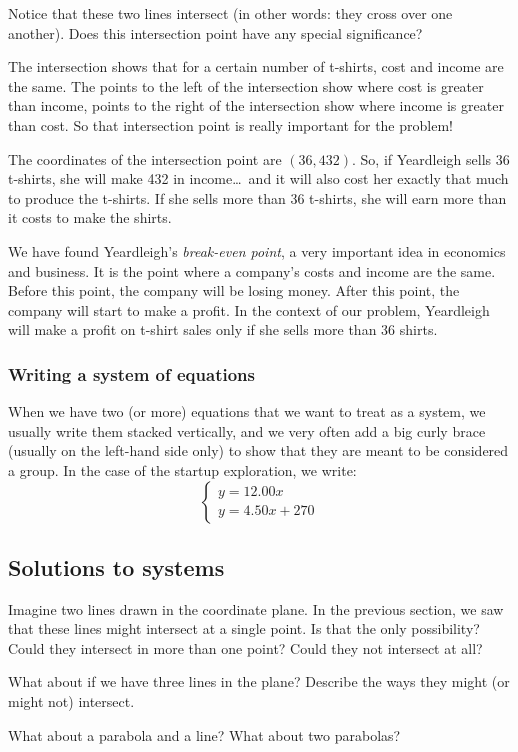 Notice that these two lines intersect (in other words: they cross over one another). Does this intersection point have any special significance?

The intersection shows that for a certain number of t-shirts, cost and income are the same. The points to the left of the intersection show where cost is greater than income, points to the right of the intersection show where income is greater than cost. So that intersection point is really important for the problem!

The coordinates of the intersection point are $(36, 432)$. So, if Yeardleigh sells 36 t-shirts, she will make 432 in income\ldots\ and it will also cost her exactly that much to produce the t-shirts. If she sells more than 36 t-shirts, she will earn more than it costs to make the shirts.

We have found Yeardleigh's \textit{break-even point}, a very important idea in economics and business. It is the point where a company's costs and income are the same. Before this point, the company will be losing money. After this point, the company will start to make a profit. In the context of our problem, Yeardleigh will make a profit on t-shirt sales only if she sells more than 36 shirts.

\subsubsection{Writing a system of equations}

When we have two (or more) equations that we want to treat as a system, we usually write them stacked vertically, and we very often add a big curly brace (usually on the left-hand side only) to show that they are meant to be considered a group. In the case of the startup exploration, we write: \[\left\{\begin{array}{l}y=12.00x\\y=4.50x+270\end{array}\right.\]

\subsection{Solutions to systems}

\begin{boxexplore}
Imagine two lines drawn in the coordinate plane. In the previous section, we saw that these lines might intersect at a single point. Is that the only possibility? Could they intersect in more than one point? Could they not intersect at all?

What about if we have three lines in the plane? Describe the ways they might (or might not) intersect.

What about a parabola and a line? What about two parabolas?
\end{boxexplore}

